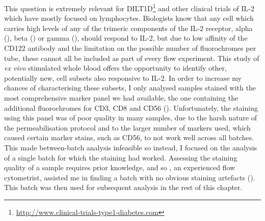 This question is extremely relevant for DILT1D\footnote{\url{http://www.clinical-trials-type1-diabetes.com}} and other clinical trials of IL-2 which have mostly focused on lymphocytes.  %
Biologists know that any cell which carries high levels of any of the trimeric components of the IL-2 receptor,
alpha (), beta () or gamma (), should respond to IL-2,
but due to low affinity of the CD122 antibody and the limitation on the possible number of fluorochromes per tube, these cannot all be included as part of every flow experiment.  
This study of \emph{ex vivo} stimulated whole blood offers the opportunity to identify other, potentially new, cell subsets also responsive to IL-2.
In order to increase my chances of characterising these subsets, I only analysed samples stained with the most comprehensive marker panel we had available, the one containing the additional fluorochromes for CD3, CD8 and CD56 ().
Unfortunately, the staining using this panel was of poor quality in many samples, due to the harsh nature of the permeabilisation protocol and to the larger number of markers used, which caused certain marker stains, such as CD56, to not work well across all batches.
This made between-batch analysis infeasible so instead, I focused on the analysis of a single batch for which the staining had worked. %
Assessing the staining quality of a sample requires prior knowledge, and so , an experienced flow cytometrist, assisted me in finding a batch with no obvious staining artefacts ().
This batch was then used for subsequent analysis in the rest of this chapter.


